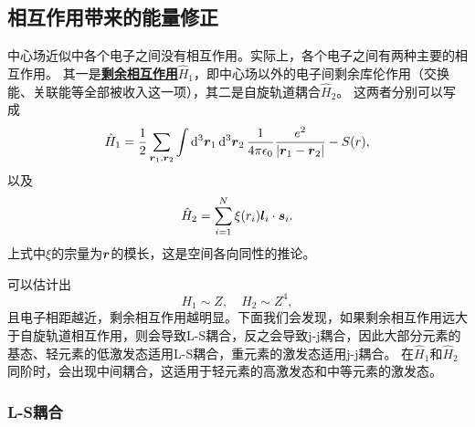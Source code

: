 \documentclass[UTF8, a4paper]{ctexart}
\newcommand*{\concept}[1]{\underline{\textbf{#1}}}
\begin{document}

\subsection{相互作用带来的能量修正}

中心场近似中各个电子之间没有相互作用。实际上，各个电子之间有两种主要的相互作用。
其一是\concept{剩余相互作用}$\hat{H}_1$，即中心场以外的电子间剩余库伦作用（交换能、关联能等全部被收入这一项），其二是自旋轨道耦合$\hat{H}_2$。
这两者分别可以写成
\begin{equation}
    \hat{H}_1 = \frac{1}{2} \sum_{\vb*{r}_1, \vb*{r}_2} \int \dd[3]{\vb*{r}_1} \dd[3]{\vb*{r}_2} \frac{1}{4 \pi \epsilon_0} \frac{e^2}{\abs{\vb*{r}_1 - \vb*{r}_2}} - S(r),
\end{equation}
以及
\begin{equation}
    \hat{H}_2 = \sum_{i=1}^N \xi(r_i) \vb*{l}_i \cdot \vb*{s}_i.
    \label{eq:spin-orbital-many}
\end{equation}
上式中$\xi$的宗量为$\vb*{r}$的模长，这是空间各向同性的推论。

可以估计出
\[
    H_1 \sim Z, \quad H_2 \sim Z^4,
\]
且电子相距越近，剩余相互作用越明显。下面我们会发现，如果剩余相互作用远大于自旋轨道相互作用，则会导致L-S耦合，反之会导致j-j耦合，因此大部分元素的基态、轻元素的低激发态适用L-S耦合，重元素的激发态适用j-j耦合。
在$\hat{H}_1$和$\hat{H}_2$同阶时，会出现中间耦合，这适用于轻元素的高激发态和中等元素的激发态。

\subsubsection{L-S耦合}\label{sec:ls-coupling}

\end{document}
